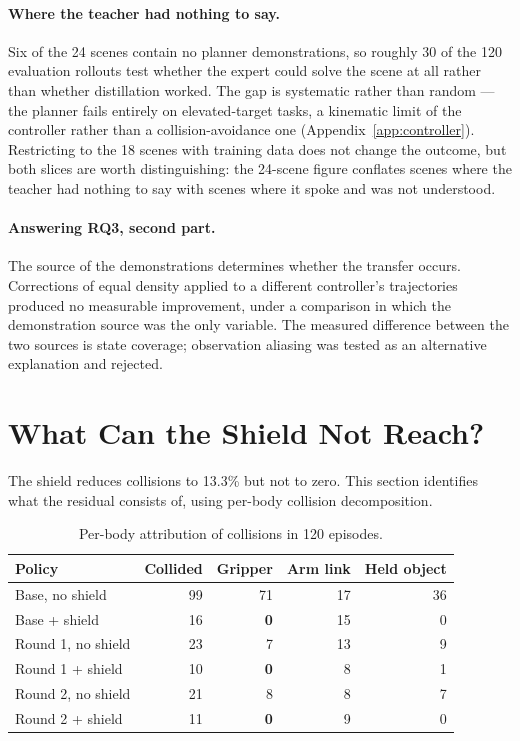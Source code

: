 \paragraph{Where the teacher had nothing to say.}
Six of the 24 scenes contain no planner demonstrations, so roughly 30 of the 120 evaluation
rollouts test whether the expert could solve the scene at all rather than whether distillation
worked. The gap is systematic rather than random --- the planner fails entirely on
elevated-target tasks, a kinematic limit of the controller rather than a collision-avoidance
one (Appendix~\ref{app:controller}). Restricting to the 18 scenes with training data does not
change the outcome, but both slices are worth distinguishing: the 24-scene figure conflates
scenes where the teacher had nothing to say with scenes where it spoke and was not understood.

\paragraph{Answering RQ3, second part.}
The source of the demonstrations determines whether the transfer occurs. Corrections of equal
density applied to a different controller's trajectories produced no measurable improvement, under
a comparison in which the demonstration source was the only variable. The measured difference
between the two sources is state coverage; observation aliasing was tested as an alternative
explanation and rejected.

\section{What Can the Shield Not Reach?}\label{sec:res:scope}

The shield reduces collisions to 13.3\% but not to zero. This section identifies what the residual
consists of, using per-body collision decomposition. 

\begin{table}[htbp]
\centering
\begin{threeparttable}
\caption[Residual collisions by culprit body]{%
  Per-body attribution of collisions in 120 episodes.}
\label{tab:culprits}
\begin{tabular}{lrrrr}
\toprule
\textbf{Policy} & \textbf{Collided} & \textbf{Gripper} & \textbf{Arm link}
  & \textbf{Held object} \\
\midrule
Base, no shield        & 99 & 71          & 17 & 36 \\
Base + shield          & 16 & \textbf{0}  & 15 & \phantom{0}0 \\
\addlinespace[2pt]
Round 1, no shield     & 23 & \phantom{0}7 & 13 & \phantom{0}9 \\
Round 1 + shield       & 10 & \textbf{0}  & \phantom{0}8 & \phantom{0}1 \\
\addlinespace[2pt]
Round 2, no shield     & 21 & \phantom{0}8 & \phantom{0}8 & \phantom{0}7 \\
Round 2 + shield       & 11 & \textbf{0}  & \phantom{0}9 & \phantom{0}0 \\
\bottomrule
\end{tabular}
\end{threeparttable}
\end{table}

